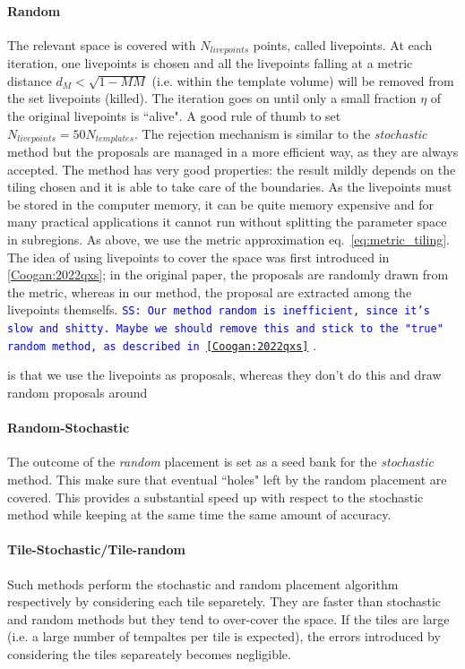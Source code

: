 \documentclass[twocolumn,showpacs,preprintnumbers,nofootinbib,prd,
superscriptaddress,10pt]{revtex4-2}
\newcommand{\stefano}[1]{{\textcolor{blue}{\texttt{SS: #1}} }}
\begin{document}
\paragraph{Random}\label{par:random}
The relevant space is covered with $N_{livepoints}$ points, called livepoints. At each iteration, one livepoints is chosen and all the livepoints falling at a metric distance $d_M<\sqrt{1-MM}$ (i.e. within the template volume)  will be removed from the set livepoints (killed). The iteration goes on until only a small fraction $\eta$ of the original livepoints is ``alive". A good rule of thumb to set $N_{livepoints} = 50 N_{templates}$.
The rejection mechanism is similar to the {\it stochastic} method but the proposals are managed in a more efficient way, as they are always accepted.
The method has very good properties: the result mildly depends on the tiling chosen and it is able to take care of the boundaries. As the livepoints must be stored in the computer memory, it can be quite memory expensive and for many practical applications it cannot run without splitting the parameter space in subregions.
As above, we use the metric approximation eq.~\eqref{eq:metric_tiling}.
\\
The idea of using livepoints to cover the space was first introduced in \ref{Coogan:2022qxs}; in the original paper, the proposals are randomly drawn from the metric, whereas in our method, the proposal are extracted among the livepoints themselfs.
\stefano{Our method random is inefficient, since it's slow and shitty. Maybe we should remove this and stick to the "true" random method, as described in \ref{Coogan:2022qxs}}.

is that we use the livepoints as proposals, whereas they don't do this and draw random proposals around
\paragraph{Random-Stochastic}\label{par:randomstochastic}
The outcome of the {\it random} placement is set as a seed bank for the {\it stochastic} method. This make sure that eventual ``holes" left by the random placement are covered. This provides a substantial speed up with respect to the stochastic method while keeping at the same time the same amount of accuracy.
\paragraph{Tile-Stochastic/Tile-random}\label{par:tilerandom_stochastic}
Such methods perform the stochastic and random placement algorithm respectively by considering each tile separetely.
They are faster than stochastic and random methods but they tend to over-cover the space. If the tiles are large (i.e. a large number of tempaltes per tile is expected), the errors introduced by considering the tiles separeately becomes negligible.
\end{document}

